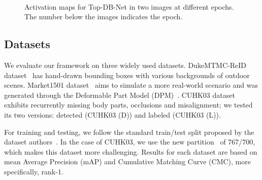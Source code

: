 \documentclass[a4paper,conference]{IEEEtran}
\begin{document}
\begin{figure}[!htb]
  \captionsetup[subfigure]{labelformat=empty}
  \centering
   \hspace*{0.1cm}
   \hspace*{0.1cm}
   \hspace*{0.1cm}
   \\
   \hspace*{0.1cm}
   \hspace*{0.1cm}
   \hspace*{0.1cm}
  \caption{Activation maps for Top-DB-Net in two images at different epochs. The number below the images indicates the epoch.}
  \label{fig:activation-examples}
\end{figure}
 
\subsection{Datasets}
 
We evaluate our framework on three widely used datasets. DukeMTMC-ReID dataset~\cite{zheng2017unlabeled,ristani2016MTMC} has hand-drawn bounding boxes with various backgrounds of outdoor scenes. Market1501 dataset~\cite{zheng2015scalable} aims to simulate a more real-world scenario and was generated through the Deformable Part Model (DPM)~\cite{felzenszwalb2009object}. CUHK03 dataset~\cite{li2014deepReID} exhibits recurrently missing body parts, occlusions and misalignment; we tested its two versions: detected (CUHK03 (D)) and labeled (CUHK03 (L)).

For training and testing, we follow the standard train/test split proposed by the dataset authors~\cite{zheng2017unlabeled,ristani2016MTMC,felzenszwalb2009object, li2014deepReID}. In the case of CUHK03, we use the new partition~\cite{zhong2017re} of 767/700, which makes this dataset more challenging. Results for each dataset are based on mean Average Precision (mAP) and Cumulative Matching Curve (CMC), more specifically, rank-1.
\end{document}
